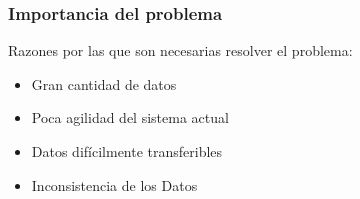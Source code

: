 \documentclass[14pt]{beamer}
\begin{document}
\begin{frame}
\begin{columns}
\begin{column}{0.5\textwidth}
\begin{center}

\end{center}
\end{column}
\end{columns}





\end{frame}


\begin{frame}
\frametitle{Importancia del problema}
Razones por las que son necesarias resolver el problema:
\begin{itemize}
\item Gran cantidad de datos
\item Poca agilidad del sistema actual
\item Datos difícilmente transferibles
\item Inconsistencia de los Datos
\end{itemize}

\end{frame}
\end{document}
